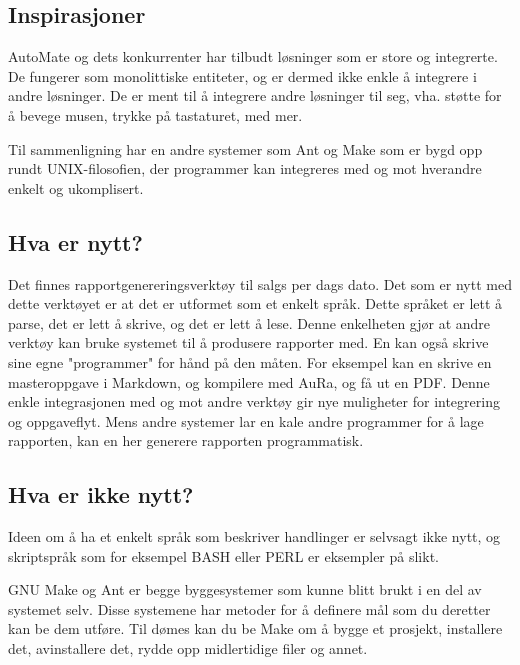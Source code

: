 \documentclass[norsk, 11pt, a4paper]{article}
\begin{document}
\subsection{Inspirasjoner}



AutoMate og dets konkurrenter har tilbudt løsninger som er store og integrerte. De fungerer som monolittiske entiteter, og er dermed ikke enkle å integrere i andre løsninger. De er ment til å integrere andre løsninger til seg, vha. støtte for å bevege musen, trykke på tastaturet, med mer.



Til sammenligning har en andre systemer som Ant og Make som er bygd opp rundt UNIX-filosofien\cite{taop}, der programmer kan integreres med og mot hverandre enkelt og ukomplisert.



\subsection{Hva er nytt?}



Det finnes rapportgenereringsverktøy til salgs per dags dato. Det som er nytt med dette verktøyet er at det er utformet som et enkelt språk. Dette språket er lett å parse, det er lett å skrive, og det er lett å lese. Denne enkelheten gjør at andre verktøy kan bruke systemet til å produsere rapporter med. En kan også skrive sine egne "programmer" for hånd på den måten. For eksempel kan en skrive en masteroppgave i Markdown, og kompilere med AuRa, og få ut en PDF. Denne enkle integrasjonen med og mot andre verktøy gir nye muligheter for integrering og oppgaveflyt. Mens andre systemer lar en kale andre programmer for å lage rapporten, kan en her generere rapporten programmatisk.



\subsection{Hva er ikke nytt?}



Ideen om å ha et enkelt språk som beskriver handlinger er selvsagt ikke nytt, og skriptspråk som for eksempel BASH eller PERL er eksempler på slikt.



GNU Make og Ant er begge byggesystemer som kunne blitt brukt i en del av systemet selv. Disse systemene har metoder for å definere mål som du deretter kan be dem utføre. Til dømes kan du be Make om å bygge et prosjekt, installere det, avinstallere det, rydde opp midlertidige filer og annet.
\end{document}
